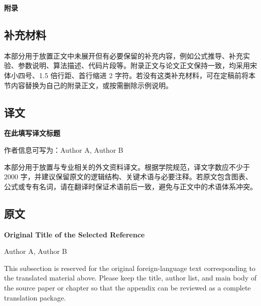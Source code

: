 \appendix
{}
{}
\begin{center}
  {\heiti{}\bfseries 附\qquad 录}
\end{center}

\vspace{1.5\baselineskip}

{\songti{}
\subsection*{补充材料}

本部分用于放置正文中未展开但有必要保留的补充内容，例如公式推导、补充实验、参数说明、算法描述、代码片段等。附录正文与论文正文保持一致，均采用宋体小四号、1.5 倍行距、首行缩进 2 字符。若没有这类补充材料，可在定稿前将本节内容替换为自己的附录正文，或按需删除示例说明。

{}
\subsection*{译文}

\begin{center}
  {\heiti{}\bfseries 在此填写译文标题}
\end{center}
\begin{center}
  {\songti{}作者信息可写为：Author A, Author B}
\end{center}

本部分用于放置与专业相关的外文资料译文。根据学院规范，译文字数应不少于 2000 字，并建议保留原文的逻辑结构、关键术语与必要注释。若原文包含图表、公式或专有名词，请在翻译时保证术语前后一致，避免与正文中的术语体系冲突。

{}
\subsection*{原文}

\begin{center}
  {\thesiswesternfont\fontsize{18pt}{27pt}\selectfont\bfseries Original Title of the Selected Reference}
\end{center}
\begin{center}
  {\thesiswesternfont{}Author A, Author B}
\end{center}

{\thesiswesternfont{}
This subsection is reserved for the original foreign-language text corresponding to the translated material above. Please keep the title, author list, and main body of the source paper or chapter so that the appendix can be reviewed as a complete translation package.
\par}

}
